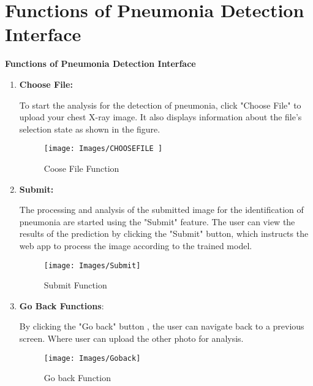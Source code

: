 %

\chapter{Functions of Pneumonia Detection Interface}

\textbf{Functions of Pneumonia Detection Interface}

\begin{enumerate}
	\item \textbf{Choose File:} 
	
	To start the analysis for the detection of pneumonia, click "Choose File" to upload your chest X-ray image. It also displays information about the file's selection state as shown in the figure.
	
	
	\begin{figure}[h!]
		\centering
		\texttt{[image: Images/CHOOSEFILE ]}
		\caption{Coose File Function }
	\end{figure}

	
	\item \textbf{	Submit:}
	
	 The processing and analysis of the submitted image for the identification of pneumonia are started using the "Submit" feature. The user can view the results of the prediction by clicking the "Submit" button, which instructs the web app to process the image according to the trained model.
	 
	 
	 \begin{figure}[h!]
	 	\centering
	 	\texttt{[image: Images/Submit]}
	 	\caption{ Submit Function }
	 \end{figure}
	
	\item \textbf{Go Back Functions}: 
	
	By clicking the "Go back" button , the user can navigate back to a previous screen. Where user can upload the other photo for analysis. 
	
	 \begin{figure}[h!]
		\centering
		\texttt{[image: Images/Goback]}
		\caption{ Go back Function }
	\end{figure}
	

\end{enumerate}
